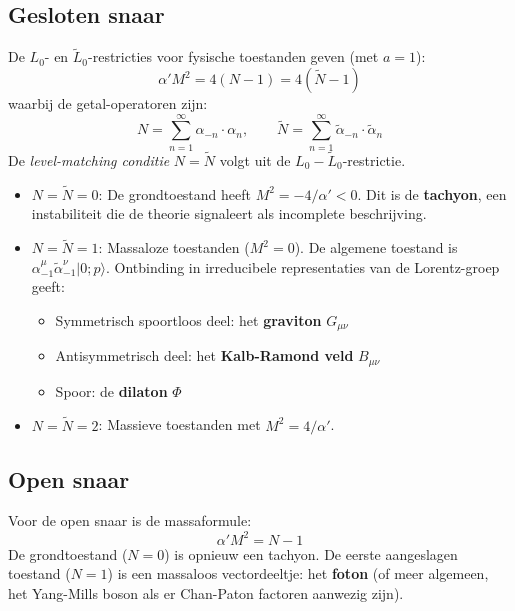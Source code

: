 \documentclass[12pt,a4paper]{article}
\begin{document}
        \subsection{Gesloten snaar}

            De $L_0$- en $\tilde L_0$-restricties voor fysische toestanden geven (met $a=1$):
            \begin{equation}
                \alpha' M^2 = 4(N - 1) = 4(\tilde N - 1)
                \label{eq:massa_gesloten}
            \end{equation}
            waarbij de getal-operatoren zijn:
            \begin{equation}
                N = \sum_{n=1}^\infty \alpha_{-n}\cdot\alpha_n, \qquad \tilde N = \sum_{n=1}^\infty \tilde\alpha_{-n}\cdot\tilde\alpha_n
            \end{equation}
            De \emph{level-matching conditie} $N = \tilde N$ volgt uit de $L_0 - \tilde L_0$-restrictie.

            \begin{itemize}
                \item $N = \tilde N = 0$: De grondtoestand heeft $M^2 = -4/\alpha' < 0$. Dit is de \textbf{tachyon}, een instabiliteit die de theorie signaleert als incomplete beschrijving.
                \item $N = \tilde N = 1$: Massaloze toestanden ($M^2 = 0$). De algemene toestand is $\alpha_{-1}^\mu\tilde\alpha_{-1}^\nu|0;p\rangle$. Ontbinding in irreducibele representaties van de Lorentz-groep geeft:
                \begin{itemize}
                    \item Symmetrisch spoortloos deel: het \textbf{graviton} $G_{\mu\nu}$
                    \item Antisymmetrisch deel: het \textbf{Kalb-Ramond veld} $B_{\mu\nu}$
                    \item Spoor: de \textbf{dilaton} $\Phi$
                \end{itemize}
                \item $N = \tilde N = 2$: Massieve toestanden met $M^2 = 4/\alpha'$.
            \end{itemize}

        \subsection{Open snaar}

            Voor de open snaar is de massaformule:
            \begin{equation}
                \alpha' M^2 = N - 1
            \end{equation}
            De grondtoestand ($N=0$) is opnieuw een tachyon. De eerste aangeslagen toestand ($N=1$) is een massaloos vectordeeltje: het \textbf{foton} (of meer algemeen, het Yang-Mills boson als er Chan-Paton factoren aanwezig zijn).
\end{document}
